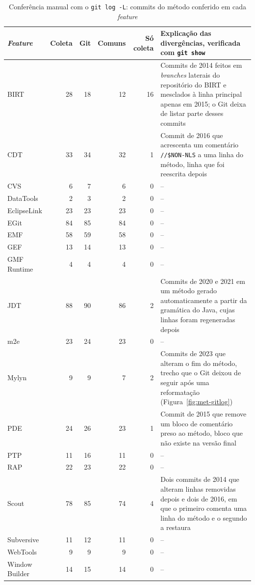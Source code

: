 \begin{table}[htbp]
    \centering
    \footnotesize
    \renewcommand{\arraystretch}{1.15}
    \caption{Conferência manual com o \texttt{git log -L}: commits do método conferido em cada \textit{feature}}
    \label{tab:ap-conferencia}
    \begin{tabularx}{\linewidth}{@{}lrrrr>{\raggedright\arraybackslash}X@{}}
        \toprule
        \textit{Feature} & Coleta & Git & Comuns & Só coleta & Explicação das divergências, verificada com \texttt{git show} \\
        \midrule
        BIRT & 28 & 18 & 12 & 16 & Commits de 2014 feitos em \textit{branches} laterais do repositório do BIRT e mesclados à linha principal apenas em 2015; o Git deixa de listar parte desses commits \\
        CDT & 33 & 34 & 32 & 1 & Commit de 2016 que acrescenta um comentário \texttt{//\$NON-NLS} a uma linha do método, linha que foi reescrita depois \\
        CVS & 6 & 7 & 6 & 0 & -- \\
        DataTools & 2 & 3 & 2 & 0 & -- \\
        EclipseLink & 23 & 23 & 23 & 0 & -- \\
        EGit & 84 & 85 & 84 & 0 & -- \\
        EMF & 58 & 59 & 58 & 0 & -- \\
        GEF & 13 & 14 & 13 & 0 & -- \\
        GMF Runtime & 4 & 4 & 4 & 0 & -- \\
        JDT & 88 & 90 & 86 & 2 & Commits de 2020 e 2021 em um método gerado automaticamente a partir da gramática do Java, cujas linhas foram regeneradas depois \\
        m2e & 23 & 24 & 23 & 0 & -- \\
        Mylyn & 9 & 9 & 7 & 2 & Commits de 2023 que alteram o fim do método, trecho que o Git deixou de seguir após uma reformatação (Figura~\ref{fig:met-gitlog}) \\
        PDE & 24 & 26 & 23 & 1 & Commit de 2015 que remove um bloco de comentário preso ao método, bloco que não existe na versão final \\
        PTP & 11 & 16 & 11 & 0 & -- \\
        RAP & 22 & 23 & 22 & 0 & -- \\
        Scout & 78 & 85 & 74 & 4 & Dois commits de 2014 que alteram linhas removidas depois e dois de 2016, em que o primeiro comenta uma linha do método e o segundo a restaura \\
        Subversive & 11 & 12 & 11 & 0 & -- \\
        WebTools & 9 & 9 & 9 & 0 & -- \\
        Window Builder & 14 & 15 & 14 & 0 & -- \\
        \bottomrule
    \end{tabularx}
\end{table}%
